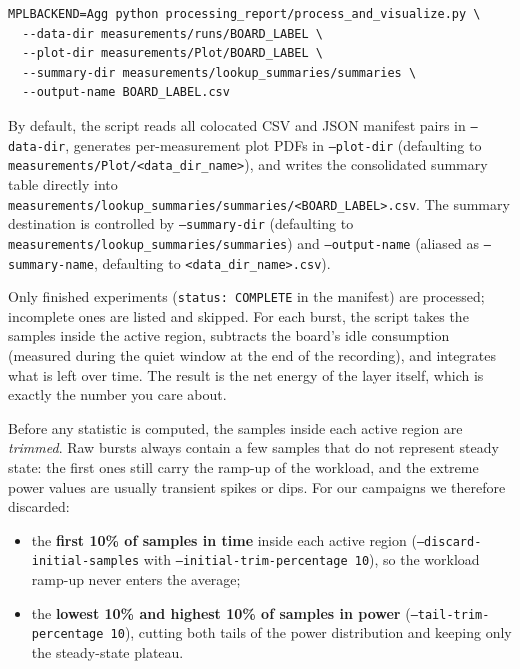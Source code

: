 \begin{lstlisting}
MPLBACKEND=Agg python processing_report/process_and_visualize.py \
  --data-dir measurements/runs/BOARD_LABEL \
  --plot-dir measurements/Plot/BOARD_LABEL \
  --summary-dir measurements/lookup_summaries/summaries \
  --output-name BOARD_LABEL.csv
\end{lstlisting}

By default, the script reads all colocated CSV and JSON manifest pairs in \texttt{--data-dir}, generates per-measurement plot PDFs in \texttt{--plot-dir} (defaulting to \texttt{measurements/}\allowbreak\texttt{Plot/}\allowbreak\texttt{<data\_dir\_name>}), and writes the consolidated summary table directly into \texttt{measurements/}\allowbreak\texttt{lookup\_summaries/}\allowbreak\texttt{summaries/}\allowbreak\texttt{<BOARD\_LABEL>.csv}. The summary destination is controlled by \texttt{--summary-dir} (defaulting to \texttt{measurements/}\allowbreak\texttt{lookup\_summaries/}\allowbreak\texttt{summaries}) and \texttt{--output-name} (aliased as \texttt{--summary-name}, defaulting to \texttt{<data\_dir\_name>.csv}).

Only finished experiments (\texttt{status: COMPLETE} in the manifest) are
processed; incomplete ones are listed and skipped. For each burst, the
script takes the samples inside the active region, subtracts the board's
idle consumption (measured during the quiet window at the end of the
recording), and integrates what is left over time. The result is the net
energy of the layer itself, which is exactly the number you care about.

Before any statistic is computed, the samples inside each active region are
\emph{trimmed}. Raw bursts always contain a few samples that do not
represent steady state: the first ones still carry the ramp-up of the
workload, and the extreme power values are usually transient spikes or
dips. For our campaigns we therefore discarded:

\begin{itemize}
    \item the \textbf{first 10\% of samples in time} inside each active
    region (\texttt{--discard-initial-samples} with
    \texttt{--initial-trim-percentage 10}), so the workload ramp-up never
    enters the average;
    \item the \textbf{lowest 10\% and highest 10\% of samples in power}
    (\texttt{--tail-trim-percentage 10}), cutting both tails of the power
    distribution and keeping only the steady-state plateau.
\end{itemize}

